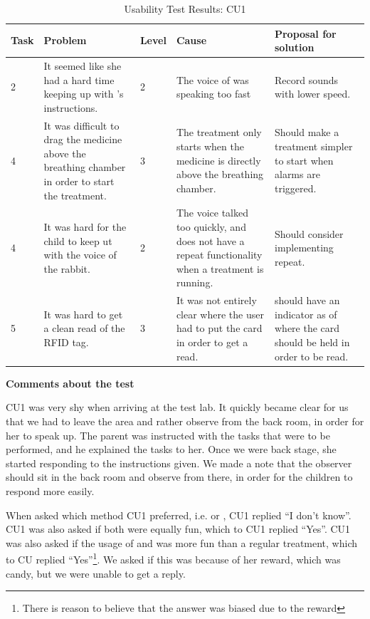 \begin{table}[H]
\centering
\begin{tabular}{| p{1.0cm} | p{4.0cm} | p{0.9cm} | p{3.6cm} | p{3.1cm} |}
\hline
	\textbf{Task} & \textbf{Problem} & \textbf{Level} & \textbf{Cause} & \textbf{Proposal for solution} \\
	\hline
	2 & It seemed like she had a hard time keeping up with \ab{}'s instructions. & 2 & The voice of \ab{} was speaking too fast & Record sounds with lower speed. \\
	\hline
	4 & It was difficult to drag the medicine above the breathing chamber in order to start the treatment. & 3 & The treatment only starts when the medicine is directly above the breathing chamber. & Should make a treatment simpler to start when alarms are triggered.  \\
	\hline
	4 & It was hard for the child to keep ut with the voice of the rabbit. & 2 & The voice talked too quickly, and \app{} does not have a repeat functionality when a treatment is running. & Should consider implementing repeat.\\ 
	\hline
	5 & It was hard to get a clean read of the RFID tag. & 3 & It was not entirely clear where the user had to put the card in order to get a read. & \ab{} should have an indicator as of where the card should be held in order to be read.  \\
	\hline
\end{tabular}
\caption{Usability Test Results: CU1}
\label{tab:testchild1}
\end{table}

\textbf{Comments about the test}

CU1 was very shy when arriving at the test lab. It quickly became clear for us that we had to leave the area and rather observe from the back room, in order for her to speak up. The parent was instructed with the tasks that were to be performed, and he explained the tasks to her. Once we were back stage, she started responding to the instructions given. We made a note that the observer should sit in the back room and observe from there, in order for the children to respond more easily.   

When asked which method CU1 preferred, i.e. \app{} or \ab{}, CU1 replied ``I don't know''. CU1 was also asked if both were equally fun, which to CU1 replied ``Yes''. CU1 was also asked if the usage of \app{} and \ab{} was more fun than a regular treatment, which to CU replied ``Yes''\footnote{There is reason to believe that the answer was biased due to the reward}. We asked if this was because of her reward, which was candy, but we were unable to get a reply. 


